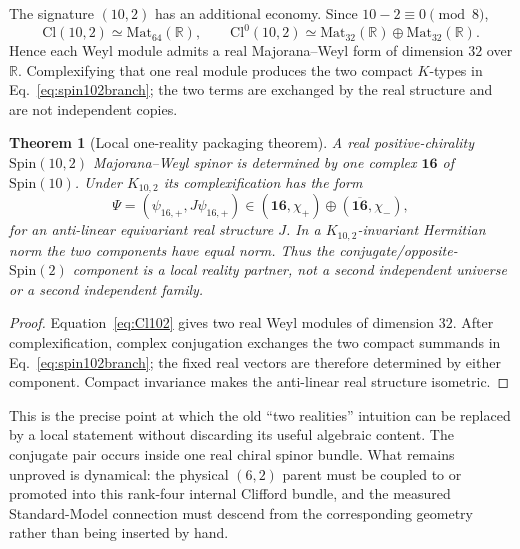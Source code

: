 \documentclass[11pt]{article}
\newtheorem{theorem}{Theorem}[section]
\theoremstyle{definition}\newtheorem{definition}[theorem]{Definition}
\theoremstyle{remark}\newtheorem{remark}[theorem]{Remark}\newtheorem{conjecture}[theorem]{Conjecture}
\begin{document}
The signature $(10,2)$ has an additional economy. Since $10-2\equiv0\pmod8$,
\begin{equation}\label{eq:Cl102}
 \mathrm{Cl}(10,2)\simeq\mathrm{Mat}_{64}(\mathbb R),
 \qquad
 \mathrm{Cl}^0(10,2)\simeq
 \mathrm{Mat}_{32}(\mathbb R)\oplus\mathrm{Mat}_{32}(\mathbb R).
\end{equation}
Hence each Weyl module admits a real Majorana--Weyl form of dimension $32$ over $\mathbb R$. Complexifying that one real module produces the two compact $K$-types in Eq.~\eqref{eq:spin102branch}; the two terms are exchanged by the real structure and are not independent copies.

\begin{theorem}[Local one-reality packaging theorem]\label{thm:spin102reality}
A real positive-chirality $\mathrm{Spin}(10,2)$ Majorana--Weyl spinor is determined by one complex $\mathbf{16}$ of $\mathrm{Spin}(10)$. Under $K_{10,2}$ its complexification has the form
\begin{equation}\label{eq:spin102realpair}
 \boxed{
 \Psi=(\psi_{16,+},J\psi_{16,+})
 \in(\mathbf{16},\chi_+)\oplus(\overline{\mathbf{16}},\chi_-),}
\end{equation}
for an anti-linear equivariant real structure $J$. In a $K_{10,2}$-invariant Hermitian norm the two components have equal norm. Thus the conjugate/opposite-$\mathrm{Spin}(2)$ component is a local reality partner, not a second independent universe or a second independent family.
\end{theorem}
\begin{proof}
Equation~\eqref{eq:Cl102} gives two real Weyl modules of dimension $32$. After complexification, complex conjugation exchanges the two compact summands in Eq.~\eqref{eq:spin102branch}; the fixed real vectors are therefore determined by either component. Compact invariance makes the anti-linear real structure isometric.
\end{proof}

This is the precise point at which the old ``two realities'' intuition can be replaced by a local statement without discarding its useful algebraic content. The conjugate pair occurs inside one real chiral spinor bundle. What remains unproved is dynamical: the physical $(6,2)$ parent must be coupled to or promoted into this rank-four internal Clifford bundle, and the measured Standard-Model connection must descend from the corresponding geometry rather than being inserted by hand.
\end{document}
